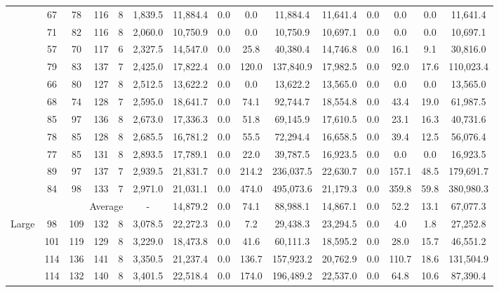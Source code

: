 \documentclass{article}
\begin{document}
\begin{table}[ht!]
{\begin{tabular}{lcccccccccccccc}
     & 67 & 78 & 116 & 8 & 1,839.5 & 11,884.4 & 0.0 & 0.0 & 11,884.4 & 11,641.4 & 0.0 & 0.0 & 0.0 & 11,641.4 \\
     & 71 & 82 & 116 & 8 & 2,060.0 & 10,750.9 & 0.0 & 0.0 & 10,750.9 & 10,697.1 & 0.0 & 0.0 & 0.0 & 10,697.1 \\
     & 57 & 70 & 117 & 6 & 2,327.5 & 14,547.0 & 0.0 & 25.8 & 40,380.4 & 14,746.8 & 0.0 & 16.1 & 9.1 & 30,816.0 \\
     & 79 & 83 & 137 & 7 & 2,425.0 & 17,822.4 & 0.0 & 120.0 & 137,840.9 & 17,982.5 & 0.0 & 92.0 & 17.6 & 110,023.4 \\
     & 66 & 80 & 127 & 8 & 2,512.5 & 13,622.2 & 0.0 & 0.0 & 13,622.2 & 13,565.0 & 0.0 & 0.0 & 0.0 & 13,565.0 \\
     & 68 & 74 & 128 & 7 & 2,595.0 & 18,641.7 & 0.0 & 74.1 & 92,744.7 & 18,554.8 & 0.0 & 43.4 & 19.0 & 61,987.5 \\
     & 85 & 97 & 136 & 8 & 2,673.0 & 17,336.3 & 0.0 & 51.8 & 69,145.9 & 17,610.5 & 0.0 & 23.1 & 16.3 & 40,731.6 \\
     & 78 & 85 & 128 & 8 & 2,685.5 & 16,781.2 & 0.0 & 55.5 & 72,294.4 & 16,658.5 & 0.0 & 39.4 & 12.5 & 56,076.4 \\
     & 77 & 85 & 131 & 8 & 2,893.5 & 17,789.1 & 0.0 & 22.0 & 39,787.5 & 16,923.5 & 0.0 & 0.0 & 0.0 & 16,923.5 \\
     & 89 & 97 & 137 & 7 & 2,939.5 & 21,831.7 & 0.0 & 214.2 & 236,037.5 & 22,630.7 & 0.0 & 157.1 & 48.5 & 179,691.7 \\
     & 84 & 98 & 133 & 7 & 2,971.0 & 21,031.1 & 0.0 & 474.0 & 495,073.6 & 21,179.3 & 0.0 & 359.8 & 59.8 & 380,980.3 \\
     \cmidrule(l){1-10} \cmidrule(l){11-15}
     \multicolumn{5}{r}{Average}  & - & 14,879.2 & 0.0 & 74.1 & 88,988.1 & 14,867.1 & 0.0 & 52.2 & 13.1 & 67,077.3 \\
     \cmidrule(l){1-10} \cmidrule(l){11-15}
     \multirow[c]{14}{*}{Large} & 98 & 109 & 132 & 8 & 3,078.5 & 22,272.3 & 0.0 & 7.2 & 29,438.3 & 23,294.5 & 0.0 & 4.0 & 1.8 & 27,252.8 \\
     & 101 & 119 & 129 & 8 & 3,229.0 & 18,473.8 & 0.0 & 41.6 & 60,111.3 & 18,595.2 & 0.0 & 28.0 & 15.7 & 46,551.2 \\
     & 114 & 136 & 141 & 8 & 3,350.5 & 21,237.4 & 0.0 & 136.7 & 157,923.2 & 20,762.9 & 0.0 & 110.7 & 18.6 & 131,504.9 \\
     & 114 & 132 & 140 & 8 & 3,401.5 & 22,518.4 & 0.0 & 174.0 & 196,489.2 & 22,537.0 & 0.0 & 64.8 & 10.6 & 87,390.4 \\

\end{tabular}}
\end{table}
\end{document}
